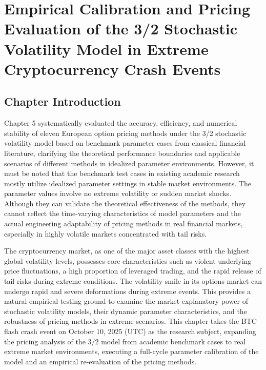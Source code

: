 \chapter{Empirical Calibration and Pricing Evaluation of the 3/2 Stochastic Volatility Model in Extreme Cryptocurrency Crash Events}

\section{Chapter Introduction}

Chapter 5 systematically evaluated the accuracy, efficiency, and numerical stability of eleven European option pricing methods under the 3/2 stochastic volatility model based on benchmark parameter cases from classical financial literature, clarifying the theoretical performance boundaries and applicable scenarios of different methods in idealized parameter environments. However, it must be noted that the benchmark test cases in existing academic research mostly utilize idealized parameter settings in stable market environments. The parameter values involve no extreme volatility or sudden market shocks. Although they can validate the theoretical effectiveness of the methods, they cannot reflect the time-varying characteristics of model parameters and the actual engineering adaptability of pricing methods in real financial markets, especially in highly volatile markets concentrated with tail risks.

The cryptocurrency market, as one of the major asset classes with the highest global volatility levels, possesses core characteristics such as violent underlying price fluctuations, a high proportion of leveraged trading, and the rapid release of tail risks during extreme conditions. The volatility smile in its options market can undergo rapid and severe deformations during extreme events. This provides a natural empirical testing ground to examine the market explanatory power of stochastic volatility models, their dynamic parameter characteristics, and the robustness of pricing methods in extreme scenarios. This chapter takes the BTC flash crash event on October 10, 2025 (UTC) as the research subject, expanding the pricing analysis of the 3/2 model from academic benchmark cases to real extreme market environments, executing a full-cycle parameter calibration of the model and an empirical re-evaluation of the pricing methods.


